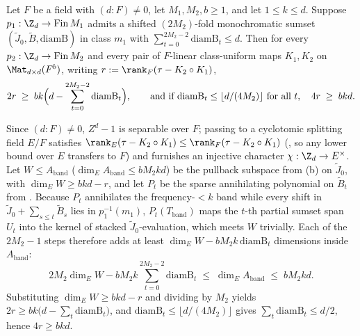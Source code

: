 \begin{theorem}\label{thm:sumset-rank}
Let $F$ be a field with $(d : F) \ne 0$, let $M_1, M_2, b \ge 1$, and let $1 \le k \le d$. Suppose
$p_1 : \Z_d \to \mathrm{Fin}\,M_1$ admits a shifted $(2M_2)$-fold monochromatic sumset
$(\widetilde{J}_0, \widetilde{B}, \mathrm{diamB})$ in class $m_1$ with
$\sum_{t=0}^{2M_2 - 2} \mathrm{diamB}_t \le d$. Then for every $p_2 : \Z_d \to \mathrm{Fin}\,M_2$
and every pair of $F$-linear class-uniform maps $K_1, K_2$ on $\Mat_{d\times d}(F^b)$, writing
$r := \rank_F(\tau - K_2 \circ K_1)$,
\[
  2r \;\ge\; b k \Bigl(d - \sum_{t=0}^{2M_2 - 2} \mathrm{diamB}_t\Bigr),
  \qquad\text{and if } \mathrm{diamB}_t \le \lfloor d/(4M_2)\rfloor \text{ for all } t,\quad
  4r \;\ge\; b k d.
\]
\end{theorem}
\begin{outline}
Since $(d : F) \ne 0$, $Z^d - 1$ is separable over $F$; passing to a cyclotomic splitting field
$E/F$ satisfies $\rank_E(\tau - K_2 \circ K_1) \le \rank_F(\tau - K_2 \circ K_1)$
(, so any lower bound over $E$ transfers to $F$) and
furnishes an injective character $\chi : \Z_d \to E^\times$.
Let $W \le A_{\mathrm{band}}$ ($\dim_E A_{\mathrm{band}} \le b M_2 k d$) be the pullback subspace
from (b) on $\widetilde{J}_0$, with $\dim_E W \ge b k d - r$, and let $P_t$
be the sparse annihilating polynomial on $\widetilde{B}_t$ from . Because
$P_t$ annihilates the frequency-$< k$ band while every shift in
$\widetilde{J}_0 + \sum_{s \le t} \widetilde{B}_s$ lies in $p_1^{-1}(m_1)$, $P_t(T_{\mathrm{band}})$ maps the
$t$-th partial sumset span $U_t$ into the kernel of stacked $\widetilde{J}_0$-evaluation, which
meets $W$ trivially. Each of the $2M_2 - 1$ steps therefore adds at least
$\dim_E W - b M_2 k\,\mathrm{diamB}_t$ dimensions inside $A_{\mathrm{band}}$:
\[
  2M_2 \dim_E W - b M_2 k \sum_{t=0}^{2M_2 - 2} \mathrm{diamB}_t \;\le\; \dim_E A_{\mathrm{band}}
  \;\le\; b M_2 k d.
\]
Substituting $\dim_E W \ge b k d - r$ and dividing by $M_2$ yields
$2r \ge bk\bigl(d - \sum_t \mathrm{diamB}_t\bigr)$, and $\mathrm{diamB}_t \le \lfloor d/(4M_2)\rfloor$
gives $\sum_t \mathrm{diamB}_t \le d/2$, hence $4r \ge b k d$.
\end{outline}

